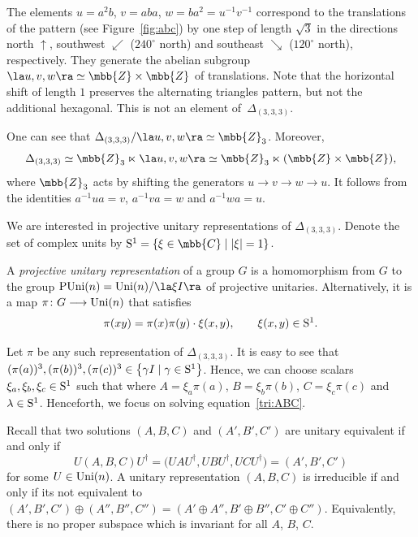 The elements $u=a^2b$, $v=aba$, $w=ba^2=u^{-1}v^{-1}$ correspond to the translations
of the pattern (see Figure~\ref{fig:abc}) by one step of length $\sqrt{3}$
in the directions north $\uparrow$,
southwest $\swarrow$ ($240^\circ$ north) and
southeast $\searrow$ ($120^\circ$ north), respectively.
They generate the abelian subgroup $\la u,v,w \ra \simeq \mbb{Z} \times \mbb{Z}$
of translations.
Note that the horizontal shift of length $1$ preserves the alternating triangles pattern,
but not the additional hexagonal. This is not an element of~$\Delta_{(3,3,3)}$.

One can see that
$\Delta_{(3,3,3)}/\la u,v,w \ra \simeq \mbb{Z}_3$.
Moreover,
\[
\Delta_{(3,3,3)} \simeq \mbb{Z}_3 \ltimes \la u,v,w \ra
\simeq \mbb{Z}_3 \ltimes (\mbb{Z} \times \mbb{Z}),
\]
where $\mbb{Z}_3$ acts by shifting the generators $u \rightarrow v \rightarrow w \rightarrow u$.
It follows from the identities $a^{-1}ua = v$, $a^{-1}va = w$ and $a^{-1}wa = u$.

We are interested in projective unitary representations of $\Delta_{(3,3,3)}$.
Denote the set of complex units by ${\rm S}^1 = \{\xi \in \mbb{C} \mid |\xi| = 1 \}$.

A \textit{projective unitary representation} of a group $G$
is a homomorphism from $G$ to the group
${\rm PUni}(n) = {\rm Uni}(n)/\la \xi I\ra$ of projective unitaries.
Alternatively, it is a map $\pi\colon G \longrightarrow {\rm Uni}(n)$ that satisfies
\begin{align*}
\pi(xy) = \pi(x)\pi(y) \cdot \xi(x, y),
\qquad
\xi(x, y) \in {\rm S}^1.
\end{align*}

Let $\pi$ be any such representation of $\Delta_{(3,3,3)}$.
It is easy to see that $(\pi(a))^3, (\pi(b))^3, (\pi(c))^3 \in \bigl\{ \gamma I \mid \gamma \in {\rm S}^1\bigr\}$.
Hence, we can choose scalars $\xi_a, \xi_b, \xi_c \in {\rm S}^1$ such that
where $A = \xi_a\pi(a)$, $B = \xi_b\pi(b)$, $C = \xi_c\pi(c)$ and $\lambda \in {\rm S}^1$.
Henceforth, we focus on solving equation~\eqref{tri:ABC}.

Recall that two solutions $(A,B,C)$ and $(A',B',C')$
are unitary equivalent if and only if
\[
U(A,B,C)U^\dag = \bigl(UAU^\dag,UBU^\dag,UCU^\dag\bigr) = (A',B',C')
\]
for some $U \in {\rm Uni}(n)$.
A unitary representation $(A,B,C)$ is irreducible if and only if its not equivalent to
$(A',B',C') \oplus (A'',B'',C'') = (A'\oplus A'',B'\oplus B'',C'\oplus C'')$.
Equivalently, there is no proper subspace which is invariant for all $A$, $B$, $C$.

